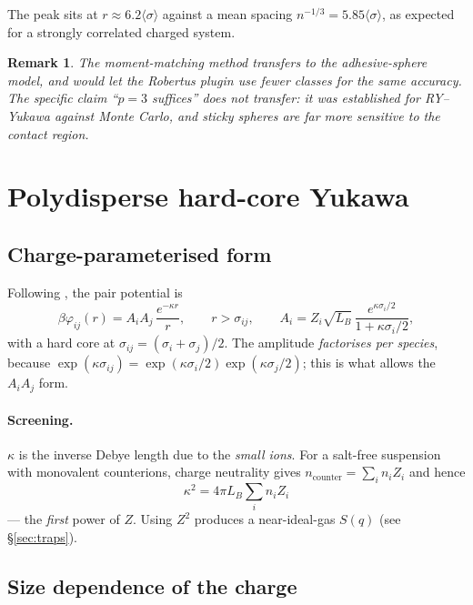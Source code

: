 \documentclass[11pt,a4paper]{article}
\newtheorem{remark}{Remark}
\begin{document}
The peak sits at $r\approx6.2\langle\sigma\rangle$ against a mean spacing
$n^{-1/3}=5.85\langle\sigma\rangle$, as expected for a strongly correlated
charged system.

\begin{remark}
The moment-matching method transfers to the adhesive-sphere model, and would
let the Robertus plugin use fewer classes for the same accuracy. The specific
claim ``$p=3$ suffices'' does \emph{not} transfer: it was established for
RY--Yukawa against Monte Carlo, and sticky spheres are far more sensitive to
the contact region.
\end{remark}

\section{Polydisperse hard-core Yukawa}

\subsection{Charge-parameterised form}

Following \cite{DAguannoKlein1992}, the pair potential is
\begin{equation}
\beta\varphi_{ij}(r) = A_iA_j\,\frac{e^{-\kappa r}}{r},\qquad r>\sigma_{ij},
\qquad
A_i = Z_i\sqrt{L_B}\,\frac{e^{\kappa\sigma_i/2}}{1+\kappa\sigma_i/2},
\label{eq:dkpot}
\end{equation}
with a hard core at $\sigma_{ij}=(\sigma_i+\sigma_j)/2$. The amplitude
\emph{factorises per species}, because
$\exp(\kappa\sigma_{ij}) = \exp(\kappa\sigma_i/2)\exp(\kappa\sigma_j/2)$;
this is what allows the $A_iA_j$ form.

\paragraph{Screening.} $\kappa$ is the inverse Debye length due to the
\emph{small ions}. For a salt-free suspension with monovalent counterions,
charge neutrality gives $n_{\text{counter}}=\sum_i n_iZ_i$ and hence
\begin{equation}
\kappa^2 = 4\pi L_B\sum_i n_i Z_i
\label{eq:kappa}
\end{equation}
--- the \emph{first} power of $Z$. Using $Z^2$ produces a near-ideal-gas
$S(q)$ (see \S\ref{sec:traps}).

\subsection{Size dependence of the charge}
\label{sec:charge}
\end{document}
